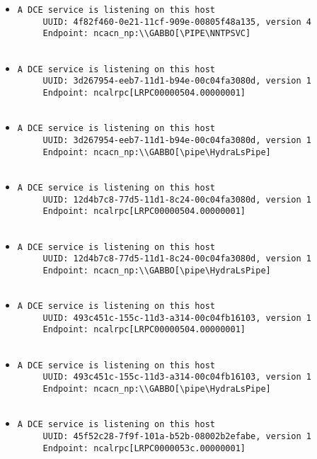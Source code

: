 \documentclass{article}
\begin{document}
\begin{itemize}
\begin{verbatim}
\end{verbatim}\item \begin{verbatim}
A DCE service is listening on this host
     UUID: 4f82f460-0e21-11cf-909e-00805f48a135, version 4
     Endpoint: ncacn_np:\\GABBO[\PIPE\NNTPSVC]


\end{verbatim}\item \begin{verbatim}
A DCE service is listening on this host
     UUID: 3d267954-eeb7-11d1-b94e-00c04fa3080d, version 1
     Endpoint: ncalrpc[LRPC00000504.00000001]


\end{verbatim}\item \begin{verbatim}
A DCE service is listening on this host
     UUID: 3d267954-eeb7-11d1-b94e-00c04fa3080d, version 1
     Endpoint: ncacn_np:\\GABBO[\pipe\HydraLsPipe]


\end{verbatim}\item \begin{verbatim}
A DCE service is listening on this host
     UUID: 12d4b7c8-77d5-11d1-8c24-00c04fa3080d, version 1
     Endpoint: ncalrpc[LRPC00000504.00000001]


\end{verbatim}\item \begin{verbatim}
A DCE service is listening on this host
     UUID: 12d4b7c8-77d5-11d1-8c24-00c04fa3080d, version 1
     Endpoint: ncacn_np:\\GABBO[\pipe\HydraLsPipe]


\end{verbatim}\item \begin{verbatim}
A DCE service is listening on this host
     UUID: 493c451c-155c-11d3-a314-00c04fb16103, version 1
     Endpoint: ncalrpc[LRPC00000504.00000001]


\end{verbatim}\item \begin{verbatim}
A DCE service is listening on this host
     UUID: 493c451c-155c-11d3-a314-00c04fb16103, version 1
     Endpoint: ncacn_np:\\GABBO[\pipe\HydraLsPipe]


\end{verbatim}\item \begin{verbatim}
A DCE service is listening on this host
     UUID: 45f52c28-7f9f-101a-b52b-08002b2efabe, version 1
     Endpoint: ncalrpc[LRPC0000053c.00000001]



\end{verbatim}
\end{itemize}
\end{document}
